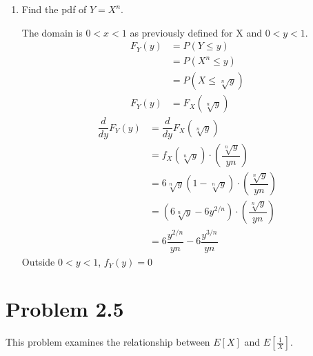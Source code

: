\documentclass[11pt]{article}
\begin{document}
\begin{enumerate}[label=(\alph*)]
    \vspace{4em}

    \item Find the pdf of $Y = X^n$.
    \begin{solution}

        The domain is $0 < x < 1$ as previously defined for X and $0 < y < 1$.
        \begin{align*}
            F_Y(y) &= P(Y \leq y) \\
            &= P(X^n \leq y) \\
            &= P(X \leq \sqrt[n]{y}) \\
            F_Y(y) &= F_X(\sqrt[n]{y})
        \end{align*}
        \begin{align*}
            \dfrac{d}{dy} F_Y(y) &= \dfrac{d}{dy} F_X(\sqrt[n]{y}) \\
            &= f_X(\sqrt[n]{y})\cdot \left( \dfrac{\sqrt[n]{y}}{yn} \right) \\
            &= 6\sqrt[n]{y}\left(1 - \sqrt[n]{y}\right) \cdot \left( \dfrac{\sqrt[n]{y}}{yn} \right) \\
            &= \left(6\sqrt[n]{y} - 6y^{2/n}\right) \cdot \left( \dfrac{\sqrt[n]{y}}{yn} \right) \\
            &= 6\dfrac{y^{2/n}}{yn} - 6 \dfrac{y^{3/n}}{yn}
        \end{align*}
        Outside $0 < y < 1$, $f_Y(y) = 0$
    \end{solution}

    \vspace{4em}

\end{enumerate}

\newpage
\section*{Problem 2.5}
This problem examines the relationship between $E[X]$ and $E\!\left[\frac{1}{X}\right]$.
\end{document}
